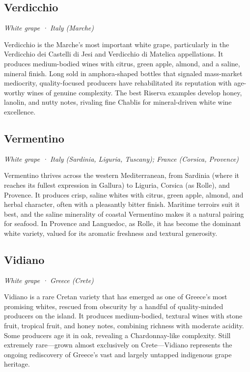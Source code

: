 \subsection*{Verdicchio}
\textit{White grape · Italy (Marche)}\par\smallskip

Verdicchio is the Marche’s most important white grape, particularly in the Verdicchio dei Castelli di Jesi and Verdicchio di Matelica appellations. It produces medium-bodied wines with citrus, green apple, almond, and a saline, mineral finish. Long sold in amphora-shaped bottles that signaled mass-market mediocrity, quality-focused producers have rehabilitated its reputation with age-worthy wines of genuine complexity. The best Riserva examples develop honey, lanolin, and nutty notes, rivaling fine Chablis for mineral-driven white wine excellence.

\subsection*{Vermentino}
\textit{White grape · Italy (Sardinia, Liguria, Tuscany); France (Corsica, Provence)}\par\smallskip

Vermentino thrives across the western Mediterranean, from Sardinia (where it reaches its fullest expression in Gallura) to Liguria, Corsica (as Rolle), and Provence. It produces crisp, saline whites with citrus, green apple, almond, and herbal character, often with a pleasantly bitter finish. Maritime terroirs suit it best, and the saline minerality of coastal Vermentino makes it a natural pairing for seafood. In Provence and Languedoc, as Rolle, it has become the dominant white variety, valued for its aromatic freshness and textural generosity.

\subsection*{Vidiano}
\textit{White grape · Greece (Crete)}\par\smallskip

Vidiano is a rare Cretan variety that has emerged as one of Greece’s most promising whites, rescued from obscurity by a handful of quality-minded producers on the island. It produces medium-bodied, textural wines with stone fruit, tropical fruit, and honey notes, combining richness with moderate acidity. Some producers age it in oak, revealing a Chardonnay-like complexity. Still extremely rare—grown almost exclusively on Crete—Vidiano represents the ongoing rediscovery of Greece’s vast and largely untapped indigenous grape heritage.

